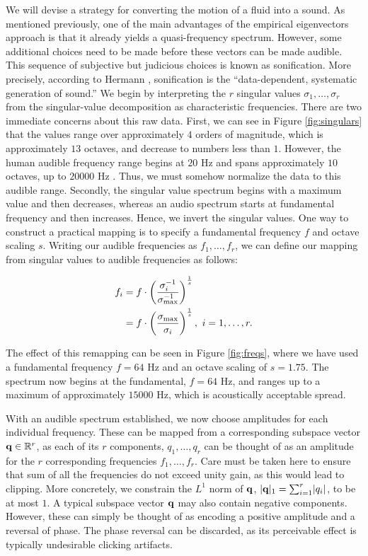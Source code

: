 \documentclass[11pt]{article}
\begin{document}
We will devise a strategy for converting the motion of a fluid into a sound. As mentioned previously, one of the main advantages of the empirical eigenvectors approach is that it already yields a quasi-frequency spectrum. However, some additional choices need to be made before these vectors can be made audible. This sequence of subjective but judicious choices is known as sonification. More precisely, according to Hermann \cite{hermann2008}, sonification is the ``data-dependent, systematic generation of sound.'' We begin by interpreting the $r$ singular values $\sigma_1, \ldots, \sigma_r$ from the singular-value decomposition as characteristic frequencies. There are two immediate concerns about this raw data. First, we can see in Figure \ref{fig:singulars} that the values range over approximately $4$ orders of magnitude, which is approximately $13$ octaves, and decrease to numbers less than $1$. However, the human audible frequency range begins at $20$ Hz and spans approximately $10$ octaves, up to $20000$ Hz \cite{rosen2011signals}. Thus, we must somehow normalize the data to this audible range. Secondly, the singular value spectrum begins with a maximum value and then decreases, whereas an audio spectrum starts at fundamental frequency and then increases. Hence, we invert the singular values. One way to construct a practical mapping is to specify a fundamental frequency $f$ and octave scaling $s$. Writing our audible frequencies as $f_1, \ldots, f_r$, we can define our mapping from singular values to audible frequencies as follows:

\begin{equation} 
\begin{aligned}
f_i &= f \cdot \left(\frac{\sigma_{i}^{-1}}{\sigma_{\textnormal{max}}^{-1}}\right)^{\frac{1}{s}} \\
&= f \cdot \left(\frac{\sigma_{\textnormal{max}}}{\sigma_i}\right)^{\frac{1}{s}}, \ i = 1, \ldots, r.
\end{aligned}
\end{equation}

The effect of this remapping can be seen in Figure \ref{fig:freqs}, where we have used a fundamental frequency $f = 64$ Hz and an octave scaling of $s = 1.75$. The spectrum now begins at the fundamental, $f = 64$ Hz, and ranges up to a maximum of approximately $15000$ Hz, which is acoustically acceptable spread.

With an audible spectrum established, we now choose amplitudes for each individual frequency. These can be mapped from a corresponding subspace vector $\mathbf{q} \in \mathbb{R}^r$, as each of its $r$ components, $q_1, \ldots, q_r$ can be thought of as an amplitude for the $r$ corresponding frequencies $f_1, \ldots, f_r$. Care must be taken here to ensure that sum of all the frequencies do not exceed unity gain, as this would lead to clipping. More concretely, we constrain the $L^1$ norm of $\mathbf{q}$, $\lvert\mathbf{q}\rvert_1 = \sum_{i=1}^{r}\lvert q_i \rvert$, to be at most $1$. A typical subspace vector $\mathbf{q}$ may also contain negative components. However, these can simply be thought of as encoding a positive amplitude and a reversal of phase. The phase reversal can be discarded, as its perceivable effect is typically undesirable clicking artifacts.
\end{document}

